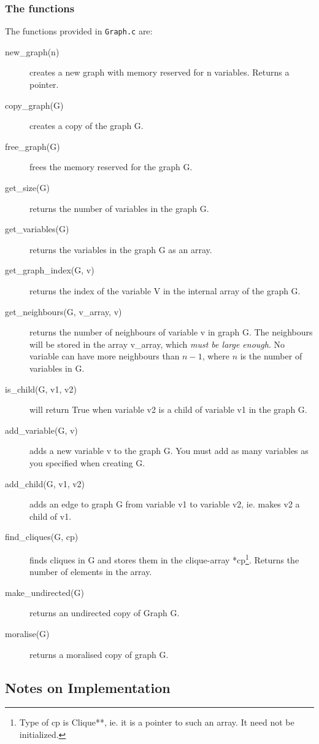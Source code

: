 \documentclass[12pt,a4paper]{report}
\newcommand{\cfilename}[1]{\verb+#1+}
\begin{document}
\subsubsection{The functions}

The functions provided in \cfilename{Graph.c} are:

\begin{description}
\item[new\_graph(n)] creates a new graph with memory reserved for n
variables. Returns a pointer.
\item[copy\_graph(G)] creates a copy of the graph G.
\item[free\_graph(G)] frees the memory reserved for the graph G.
\item[get\_size(G)] returns the number of variables in the graph G.
\item[get\_variables(G)] returns the variables in the graph G as an array.
\item[get\_graph\_index(G, v)] returns the index of the
variable V in the internal array of the graph G.
\item[get\_neighbours(G, v\_array, v)] returns the number of neighbours
of variable v in graph G. The neighbours will be stored in the array
v\_array, which {\it must be large enough}. No variable can have more
neighbours than $n-1$, where $n$ is the number of variables in G.
\item[is\_child(G, v1, v2)] will return True when variable v2 is a
child of variable v1 in the graph G.
\item[add\_variable(G, v)] adds a new variable v to the graph G. You
must add as many variables as you specified when creating G.
\item[add\_child(G, v1, v2)] adds an edge to graph G from variable v1
to variable v2, ie. makes v2 a child of v1.
\item[find\_cliques(G, cp)] finds cliques in G and stores them
in the clique-array *cp\footnote{Type of cp is Clique**, ie. it is a
pointer to such an array. It need not be initialized.}. Returns the
number of elements in the array.
\item[make\_undirected(G)] returns an undirected copy of Graph G.
\item[moralise(G)] returns a moralised copy of graph G.

\end{description}

\subsection{Notes on Implementation}
\end{document}
